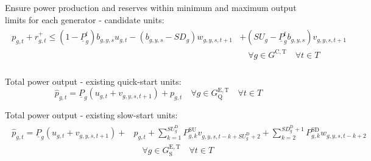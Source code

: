 \documentclass{article}
\newcommand{\sGeneratorsCandidateThermal}{G^{\mathrm{C,T}}}
\newcommand{\sIntervals}{T}
\newcommand{\sGeneratorsExistingThermalQuickStart}{G^{\mathrm{E,T}}_\mathrm{Q}}
\newcommand{\sGeneratorsCandidateThermalQuickStart}{G^{\mathrm{C,T}}_\mathrm{Q}}
\newcommand{\sGeneratorsExistingThermalSlowStart}{G^{\mathrm{E,T}}_\mathrm{S}}
\newcommand{\iGenerator}{g}
\newcommand{\iYear}{y}
\newcommand{\iScenario}{s}
\newcommand{\iInterval}{t}
\newcommand{\iIntervalAlias}{k}
\newcommand{\cPowerOutputMin}[1][\iGenerator]{\underline{P}_{#1}}
\newcommand{\cStartupDuration}[1][\iGenerator]{SU_{#1}^{\mathrm{D}}}
\newcommand{\cStartupTrajectory}[1][\iGenerator,\iIntervalAlias]{P^{\mathrm{SU}}_{#1}}
\newcommand{\cShutdownDuration}[1][\iGenerator]{SD_{#1}^{\mathrm{D}}}
\newcommand{\cShutdownTrajectory}[1][\iGenerator,\iIntervalAlias]{P^{\mathrm{SD}}_{#1}}
\newcommand{\cPowerOutputMinProportion}{\cPowerOutputMin^{\mathrm{f}}}
\newcommand{\cRampRateStartup}[1][\iGenerator]{SU_{#1}}
\newcommand{\cRampRateShutdown}[1][\iGenerator]{SD_{#1}}
\newcommand{\vStartupIndicator}[1][\iGenerator,\iInterval]{v_{#1}}
\newcommand{\vShutdownIndicator}[1][\iGenerator,\iInterval]{w_{#1}}
\newcommand{\vReserveUp}[1][\iGenerator,\iInterval]{r^{+}_{#1}}
\newcommand{\vOnIndicator}[1][\iGenerator,\iInterval]{u_{#1}}
\newcommand{\vPower}[1][\iGenerator,\iInterval]{p_{#1}}
\newcommand{\vPowerTotal}[1][\iGenerator,\iInterval]{\hat{p}_{#1}}
\newcommand{\vInstalledCapacityTotalScenario}[1][\iGenerator,\iYear,\iScenario]{b_{#1}}
\begin{document}
Ensure power production and reserves within minimum and maximum output limits for each generator - candidate units:
\begin{align}
	\begin{split}
		\vPower + \vReserveUp \leq \left(1 - \cPowerOutputMinProportion\right) \vInstalledCapacityTotalScenario \vOnIndicator - \left(\vInstalledCapacityTotalScenario -\cRampRateShutdown \right) \vShutdownIndicator[\iGenerator,\iYear,\iScenario,\iInterval+1] & + \left(\cRampRateStartup - \cPowerOutputMinProportion\vInstalledCapacityTotalScenario \right)\vStartupIndicator[\iGenerator,\iYear,\iScenario,\iInterval+1]\\
		& \quad \forall \iGenerator \in \sGeneratorsCandidateThermal  \quad \forall \iInterval \in \sIntervals\\
		\label{eqn: power output within limits - candidate}
	\end{split}
\end{align}

Total power output - existing quick-start units:
\begin{equation}
\vPowerTotal = \cPowerOutputMin \left(\vOnIndicator + \vStartupIndicator[\iGenerator,\iYear,\iScenario,\iInterval+1]\right) + \vPower \quad \forall \iGenerator \in \sGeneratorsExistingThermalQuickStart  \quad \forall \iInterval \in \sIntervals
\end{equation}


Total power output - existing slow-start units:
\begin{align}
\begin{split}
\vPowerTotal =  \cPowerOutputMin \left(\vOnIndicator + \vStartupIndicator[\iGenerator,\iYear,\iScenario,\iInterval+1]\right) + & \vPower + \sum\limits_{\iIntervalAlias=1}^{\cStartupDuration} \cStartupTrajectory \vStartupIndicator[\iGenerator,\iYear,\iScenario,\iInterval-\iIntervalAlias+\cStartupDuration+2] + \sum\limits_{\iIntervalAlias=2}^{\cShutdownDuration + 1} \cShutdownTrajectory \vShutdownIndicator[\iGenerator,\iYear,\iScenario,\iInterval-\iIntervalAlias+2]\\
& \quad \forall \iGenerator \in \sGeneratorsExistingThermalSlowStart  \quad \forall \iInterval \in \sIntervals
\end{split}
\end{align}
\end{document}
